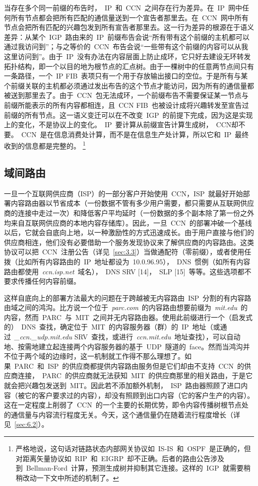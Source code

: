 当存在多个同一前缀的布告时，~IP~和~CCN~之间存在行为差异。在~IP~网中任何所有节点都会把所有匹配的通信量送到一个宣告者那里去。在~CCN~网中所有节点会把所有匹配的兴趣包发到所有宣告者那里去。这一行为差异的根源在于语义差异：从某个~IGP~路由来的~IP~前缀布告会说“所有带有这个前缀的主机都可以通过我访问到”；与之等价的~CCN~布告会说“一些带有这个前缀的内容可以从我这里访问到”。由于~IP~没有办法在内容层面上防止成环，它只好去建设无环转发拓扑结构，即一个以目的地为根节点的汇点树。由于一棵树中的任意两节点间只有一条路径，一个~IP FIB~表项只有一个用于存放输出接口的空位。于是所有与某个前缀关联的主机都必须通过发出布告的这个节点才能访问，因为所有的通信量都被送到那里去了。由于~CCN~包无法成环，一个前缀布告不需要保证某一节点与前缀所能表示的所有内容都相连，且~CCN FIB~也被设计成将兴趣转发至宣告过前缀的所有节点。这一语义变迁可以在不改变~IGP~的前提下完成，因为这是实现上的变化，不是协议上的变化。~IP~要计算从前缀宣告计算生成树，~CCN却不要。~CCN~是在信息消费处计算，而不是在信息生产处计算，所以它和~IP~最终收到的信息都是完整的。
\renewcommand\baselinestretch{1} %
\footnote{严格地说，这句话对链路状态内部网关协议如~IS-IS~和~OSPF~是正确的，但对距离矢量协议如~RIP~和~EIGRP~却不正确。后者的路由公告涉及到~Bellman-Ford~计算，预测生成树并抑制其它连接。这样的~IGP~就需要稍稍改动一下文中所述的机制了。}

\subsection{域间路由}
\label{sec:4.2}
一旦一个互联网供应商（ISP）的一部分客户开始使用~CCN，ISP~就最好开始部署内容路由器以节省成本（一份数据不管有多少用户需要，都只需要从互联网供应商的连接中走过一次）和降低客户平均延时（一份数据的多个副本除了第一份之外均来自互联网供应商的本地内容存储库）。因此，一旦~CCN~的部署冲破一个基线以后，它就会自底向上地，以一种激励性的方式迅速成长。由于用户直接与他们的供应商相连，他们没有必要借助一个服务发现协议来了解供应商的内容路由。这类协议可以把~CCN~注册公告（详见~\ref{sec:3.3}）当做通配符（零前缀），或者使用任拨（比如所有内容路由的~IP~地址都设为~10.0.96.95），~DNS~惯例（如所有内容路由都使用~\emph{ccn.isp.net}~域名），~DNS SRV [14]，~SLP [15]~等等。这些选项都不要求传播任何内容前缀。

这样自底向上的部署方法最大的问题在于跨越被无内容路由~ISP~分割的有内容路由域之间的鸿沟。比方说一个位于~\emph{parc.com}~的内容路由想要前缀为~\emph{mit.edu}~的内容，然而~PARC~与~MIT~之间并无内容路由器。使用此前缀进行一个（启发式的）~DNS~查找，确定位于~MIT~的内容服务器（群）的~IP~地址（或通过~\emph{\_ccn.\_udp.mit.edu} SRV~查找，或进行~\emph{ccn.mit.edu}~地址查找），可以自动地、按需地建立起连接两个内容服务器的基于~UDP~隧道的~face。然而当鸿沟并不位于两个域的边缘时，这一机制就工作得不那么理想了。如果~PARC~和~ISP~的供应商都提供内容路由服务但是它们却由不支持~CCN~的供应商连接，~PARC~的供应商就无法获知~MIT~的供应商那里的相关路由，于是它就会把兴趣包发送到~MIT。因此若不添加额外机制，~ISP~路由器照顾了进口内容（被它的客户要求过的内容），却没有照顾到出口内容（它的客户生产的内容）。这在一定程度上削弱了~CCN~的一个主要的长期优势，即令内容传播树根节点处的通信量与内容流行程度无关。今天，这个通信量仍在随着流行程度增长（详见~\ref{sec:6.2}）。

